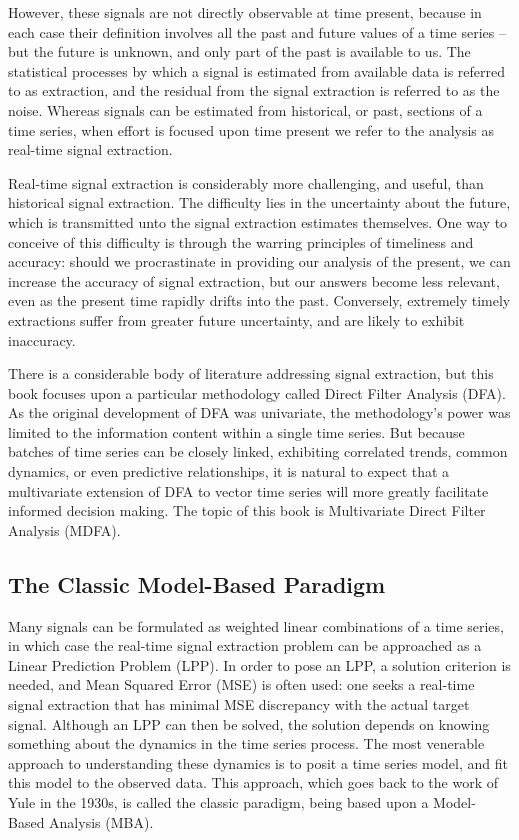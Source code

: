 \documentclass[a4paper]{book}
\begin{document}
However, these signals are not directly observable at time present, because in each case their
 definition involves all the past and future values of a time series -- but the future is unknown,
 and only part of the past is available to us.  The statistical processes by which a signal is
 estimated from available data is referred to as extraction, and the residual from the 
 signal extraction is referred to as the noise.  Whereas signals can be estimated from historical, or past,
 sections of a time series, when effort is focused upon time present we refer to the analysis as
 real-time signal extraction.

Real-time signal extraction is considerably more challenging, and useful, than historical signal extraction.
 The difficulty lies in the uncertainty about the future, which is transmitted unto the signal 
 extraction estimates themselves.  One way to conceive of this difficulty is through the warring
 principles of timeliness and accuracy: should we procrastinate in providing our analysis of the present,
 we can increase the accuracy of signal extraction, but our answers become less relevant, even as the present
 time rapidly drifts into the past.  Conversely,   extremely timely extractions suffer from 
 greater future uncertainty, and are likely to exhibit inaccuracy.

There is a considerable body of literature addressing signal extraction, but this book focuses upon
 a particular methodology called Direct Filter Analysis (DFA).  As the original development of DFA
 was univariate, the methodology's power was limited to the information content
 within a single time series.  But because batches of time series can be closely linked, exhibiting 
 correlated trends, common dynamics, or even predictive relationships, it is natural to expect that
 a multivariate extension of DFA to vector time series will more greatly facilitate informed decision 
 making.  The topic of this book is Multivariate Direct Filter Analysis (MDFA).

 

\subsection{The Classic Model-Based Paradigm}

Many signals can be formulated as weighted linear combinations of a time series, in which case the real-time
 signal extraction problem can be approached as a Linear Prediction Problem (LPP).  In order to pose
 an LPP, a solution criterion is needed, and Mean Squared Error (MSE) is often used: one seeks a real-time 
 signal extraction that has minimal MSE discrepancy with the actual target signal.  Although an LPP
 can then be solved, the solution depends on knowing something about the dynamics in the time series process.
 The most venerable approach to understanding these dynamics is to posit a time series model, and fit
 this model to the observed data.  This approach, which goes back to the work of Yule in the 1930s, is called
 the classic paradigm, being based upon a Model-Based Analysis (MBA).
\end{document}
